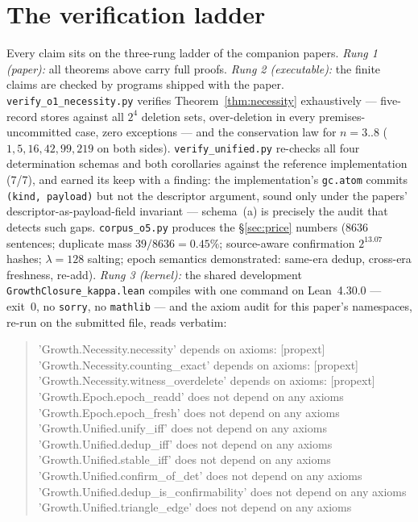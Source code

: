 \documentclass[10pt]{article}
\begin{document}
\section{The verification ladder}\label{sec:verification}

Every claim sits on the three-rung ladder of the companion papers. \emph{Rung 1 (paper):} all theorems above carry full proofs. \emph{Rung 2 (executable):} the finite claims are checked by programs shipped with the paper. \texttt{verify\_o1\_necessity.py} verifies Theorem~\ref{thm:necessity} exhaustively --- five-record stores against all $2^4$ deletion sets, over-deletion in every premises-uncommitted case, zero exceptions --- and the conservation law for $n=3..8$ ($1,5,16,42,99,219$ on both sides). \texttt{verify\_unified.py} re-checks all four determination schemas and both corollaries against the reference implementation (7/7), and earned its keep with a finding: the implementation's \texttt{gc.atom} commits \texttt{(kind, payload)} but not the descriptor argument, sound only under the papers' descriptor-as-payload-field invariant --- schema~(a) is precisely the audit that detects such gaps. \texttt{corpus\_o5.py} produces the \S\ref{sec:price} numbers (8636 sentences; duplicate mass $39/8636=0.45\%$; source-aware confirmation $2^{13.07}$ hashes; $\lambda{=}128$ salting; epoch semantics demonstrated: same-era dedup, cross-era freshness, re-add). \emph{Rung 3 (kernel):} the shared development \texttt{GrowthClosure\_kappa.lean} compiles with one command on Lean~4.30.0 --- exit~0, no \texttt{sorry}, no \texttt{mathlib} --- and the axiom audit for this paper's namespaces, re-run on the submitted file, reads verbatim:

\begin{quote}\footnotesize\ttfamily
'Growth.Necessity.necessity' depends on axioms: [propext]\\
'Growth.Necessity.counting\_exact' depends on axioms: [propext]\\
'Growth.Necessity.witness\_overdelete' depends on axioms: [propext]\\
'Growth.Epoch.epoch\_readd' does not depend on any axioms\\
'Growth.Epoch.epoch\_fresh' does not depend on any axioms\\
'Growth.Unified.unify\_iff' does not depend on any axioms\\
'Growth.Unified.dedup\_iff' does not depend on any axioms\\
'Growth.Unified.stable\_iff' does not depend on any axioms\\
'Growth.Unified.confirm\_of\_det' does not depend on any axioms\\
'Growth.Unified.dedup\_is\_confirmability' does not depend on any axioms\\
'Growth.Unified.triangle\_edge' does not depend on any axioms
\end{quote}
\end{document}
